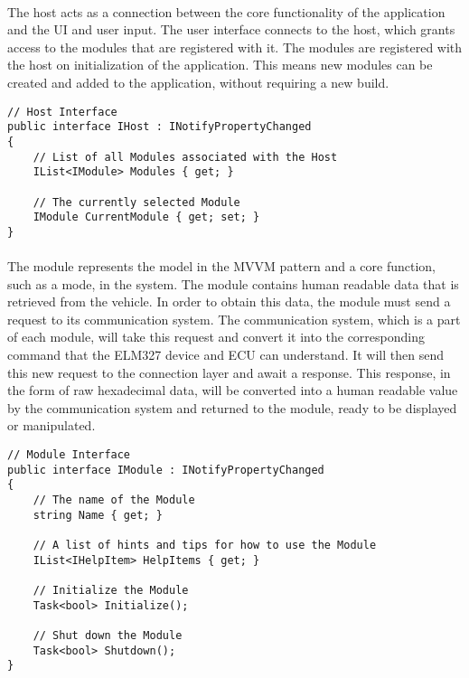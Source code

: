 	\paragraph{}{
	The host acts as a connection between the core functionality of the application and the UI and user input. The user interface connects to the host, which grants access to the modules that are registered with it. The modules are registered with the host on initialization of the application. This means new modules can be created and added to the application, without requiring a new build.
	\\
	\begin{lstlisting}
// Host Interface
public interface IHost : INotifyPropertyChanged
{
	// List of all Modules associated with the Host
	IList<IModule> Modules { get; }
	
	// The currently selected Module
	IModule CurrentModule { get; set; }
}
	\end{lstlisting}
	}
	\paragraph{}{
	The module represents the model in the MVVM pattern and a core function, such as a mode, in the system. The module contains human readable data that is retrieved from the vehicle. In order to obtain this data, the module must send a request to its communication system. The communication system, which is a part of each module, will take this request and convert it into the corresponding command that the ELM327 device and ECU can understand. It will then send this new request to the connection layer and await a response. This response, in the form of raw hexadecimal data, will be converted into a human readable value by the communication system and returned to the module, ready to be displayed or manipulated.
	\\
	\begin{lstlisting}
// Module Interface
public interface IModule : INotifyPropertyChanged
{
	// The name of the Module
	string Name { get; }
	
	// A list of hints and tips for how to use the Module
	IList<IHelpItem> HelpItems { get; }

	// Initialize the Module
	Task<bool> Initialize();

	// Shut down the Module
	Task<bool> Shutdown(); 
}
	\end{lstlisting}
	}
